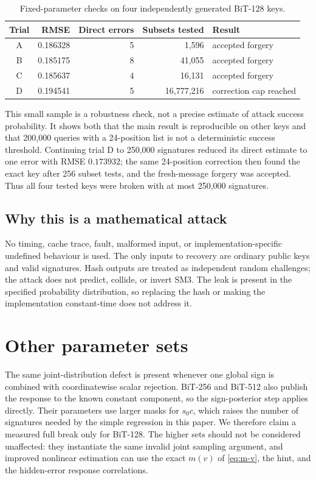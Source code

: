\documentclass[11pt,a4paper]{article}
\begin{document}
\begin{table}[ht]
\centering
\caption{Fixed-parameter checks on four independently generated BiT-128 keys.}
\label{tab:replications}
\begin{tabular}{@{}crrrl@{}}
\toprule
Trial & RMSE & Direct errors & Subsets tested & Result \\
\midrule
A & 0.186328 & 5 & 1,596 & accepted forgery \\
B & 0.185175 & 8 & 41,055 & accepted forgery \\
C & 0.185637 & 4 & 16,131 & accepted forgery \\
D & 0.194541 & 5 & 16,777,216 & correction cap reached \\
\bottomrule
\end{tabular}
\end{table}

This small sample is a robustness check, not a precise estimate of attack
success probability.  It shows both that the main result is reproducible on
other keys and that 200,000 queries with a 24-position list is not a
deterministic success threshold.  Continuing trial D to 250,000 signatures
reduced its direct estimate to one error with RMSE $0.173932$; the same
24-position correction then found the exact key after 256 subset tests, and the
fresh-message forgery was accepted.  Thus all four tested keys were broken with
at most 250,000 signatures.

\subsection{Why this is a mathematical attack}

No timing, cache trace, fault, malformed input, or implementation-specific
undefined behaviour is used.  The only inputs to recovery are ordinary public
keys and valid signatures.  Hash outputs are treated as independent random
challenges; the attack does not predict, collide, or invert SM3.  The leak is
present in the specified probability distribution, so replacing the hash or
making the implementation constant-time does not address it.

\section{Other parameter sets}

The same joint-distribution defect is present whenever one global sign is
combined with coordinatewise scalar rejection.  BiT-256 and BiT-512 also
publish the response to the known constant component, so the sign-posterior
step applies directly.  Their parameters use larger masks for $s_0c$, which
raises the number of signatures needed by the simple regression in this paper.
We therefore claim a measured full break only for BiT-128.  The higher sets
should not be considered unaffected: they instantiate the same invalid joint
sampling argument, and improved nonlinear estimation can use the exact
$m(v)$ of \eqref{eq:m-v}, the hint, and the hidden-error response correlations.
\end{document}
